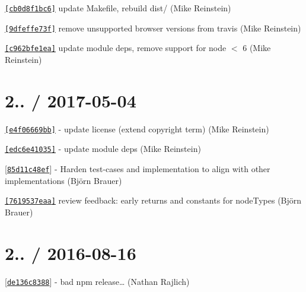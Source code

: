 
\begin{DoxyItemize}
\item \href{https://github.com/TooTallNate/plist.js/commit/cb0d8f1bc60dee423f8fc2cfcac427452dfaddb0}{\tt \mbox{[}{\ttfamily cb0d8f1bc6}\mbox{]}} update Makefile, rebuild dist/ (Mike Reinstein)
\item \href{https://github.com/TooTallNate/plist.js/commit/9dfeffe73fdb447ac5a87ee364a1472975f12adf}{\tt \mbox{[}{\ttfamily 9dfeffe73f}\mbox{]}} remove unsupported browser versions from travis (Mike Reinstein)
\item \href{https://github.com/TooTallNate/plist.js/commit/c962bfe1ea04dd87966250253d33738bceecab61}{\tt \mbox{[}{\ttfamily c962bfe1ea}\mbox{]}} update module deps, remove support for node $<$ 6 (Mike Reinstein)
\end{DoxyItemize}

\section*{2.. / 2017-\/05-\/04 }


\begin{DoxyItemize}
\item \href{https://github.com/TooTallNate/plist.js/commit/e4f06669bb51d2e65654df7c39aab52bc3bf4e8a}{\tt \mbox{[}{\ttfamily e4f06669bb}\mbox{]}} -\/ update license (extend copyright term) (Mike Reinstein)
\item \href{https://github.com/TooTallNate/plist.js/commit/edc6e4103546b1d7518a577e7c202c305a8abec0}{\tt \mbox{[}{\ttfamily edc6e41035}\mbox{]}} -\/ update module deps (Mike Reinstein)
\item \mbox{[}\href{https://github.com/TooTallNate/plist.js/commit/85d11c48eff02312cbdd67f46fd8e74b0d372ca1}{\tt {\ttfamily 85d11c48ef}}\mbox{]} -\/ Harden test-\/cases and implementation to align with other implementations (Björn Brauer)
\item \href{https://github.com/TooTallNate/plist.js/commit/7619537eaa9e3e5a80829e759c004d2e017a07d2}{\tt \mbox{[}{\ttfamily 7619537eaa}\mbox{]}} review feedback\+: early returns and constants for node\+Types (Björn Brauer)
\end{DoxyItemize}

\section*{2.. / 2016-\/08-\/16 }


\begin{DoxyItemize}
\item \mbox{[}\href{https://github.com/TooTallNate/plist/commit/de136c8388}{\tt {\ttfamily de136c8388}}\mbox{]} -\/ bad npm release… (Nathan Rajlich)
\end{DoxyItemize}

